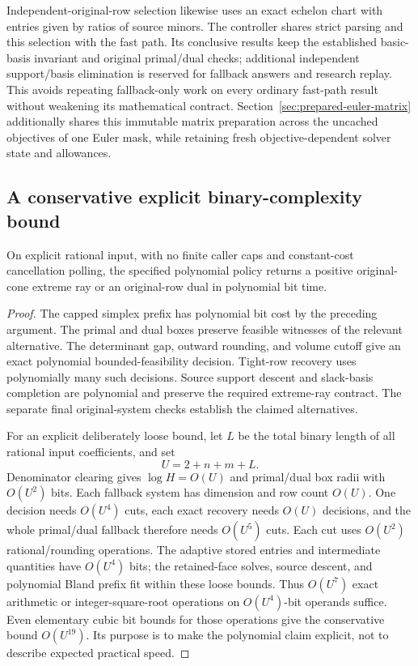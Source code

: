 Independent-original-row selection likewise uses an exact echelon chart
with entries given by ratios of source minors.  The controller shares strict
parsing and this selection with the fast path.  Its conclusive results keep
the established basic-basis invariant and original primal/dual checks;
additional independent support/basis elimination is reserved for fallback
answers and research replay.  This avoids repeating fallback-only work on
every ordinary fast-path result without weakening its mathematical contract.
Section~\ref{sec:prepared-euler-matrix} additionally shares this immutable
matrix preparation across the uncached objectives of one Euler mask,
while retaining fresh objective-dependent solver state and allowances.

\subsection{A conservative explicit binary-complexity bound}

\begin{proposition}
On explicit rational input, with no finite caller caps and constant-cost
cancellation polling, the specified polynomial policy returns a positive
original-cone extreme ray or an original-row dual in polynomial bit time.
\end{proposition}
\begin{proof}
The capped simplex prefix has polynomial bit cost by the preceding argument.
The primal and dual boxes preserve feasible witnesses of the relevant
alternative.  The determinant gap, outward rounding, and volume cutoff give
an exact polynomial bounded-feasibility decision.  Tight-row recovery uses
polynomially many such decisions.  Source support descent and slack-basis
completion are polynomial and preserve the required extreme-ray contract.
The separate final original-system checks establish the claimed alternatives.

For an explicit deliberately loose bound, let $L$ be the total binary length
of all rational input coefficients, and set
\[
 U=2+n+m+L.
\]
Denominator clearing gives $\log H=O(U)$ and primal/dual box radii with
$O(U^2)$ bits.  Each fallback system has dimension and row count $O(U)$.
One decision needs $O(U^4)$ cuts, each exact recovery needs $O(U)$ decisions,
and the whole primal/dual fallback therefore needs $O(U^5)$ cuts.  Each cut
uses $O(U^2)$ rational/rounding operations.  The adaptive stored entries and
intermediate quantities have $O(U^4)$ bits; the retained-face solves,
source descent, and polynomial Bland prefix fit within these loose bounds.
Thus $O(U^7)$ exact arithmetic or integer-square-root operations on
$O(U^4)$-bit operands suffice.  Even elementary cubic bit bounds for those
operations give the conservative bound $O(U^{19})$.  Its purpose is to make
the polynomial claim explicit, not to describe expected practical speed.
\end{proof}

